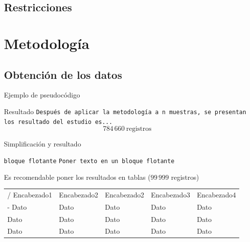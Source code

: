 \documentclass[9pt]{beamer}
\begin{document}
\subsection{Restricciones}



\section{Metodología}
\subsection{Obtención de los datos}
	
	\begin{frame}{Ejemplo de pseudocódigo }
		\begin{algorithm}[H] %
			\SetAlgoLined
		\end{algorithm}
		
	\end{frame}

	\begin{frame}{Resultado}
		\texttt{Después de aplicar la metodología a n muestras, se presentan los resultado del estudio es...}  \\

		\[
			784\, 660 \ \text{registros}
		\]
	\end{frame}


	\begin{frame}{Simplificación y resultado}
		\begin{block}{\texttt{bloque flotante} }
			\texttt{Poner texto en un bloque flotante}\citet{arias2006}
		\end{block}

		\begin{block}{Es recomendable poner los resultados en tablas ($99\,999$ registros)}

			\begin{tabu} to \textwidth {|X[0.15r]|X[0.15r]|X|X[0.15r]|X[0.15r]|}
				\hline
				/
			Encabezado1  & Encabezado2 & Encabezado2 & Encabezado3 & Encabezado4 \\ \tabucline[2 pt]-
			Dato & Dato & Dato & Dato & Dato \\ \hline
			Dato & Dato & Dato & Dato & Dato \\ \hline
			Dato & Dato & Dato & Dato & Dato \\ \hline
			\end{tabu}
		\end{block}
		
	\end{frame}
\end{document}
